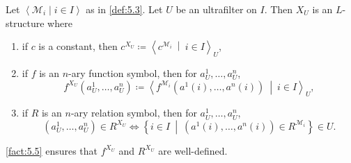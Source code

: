 \documentclass{article}
\begin{document}
\begin{ndef} \label{def:5.6}
Let $\left< \mathcal{M}_i \mid i \in I \right>$ as in \cref{def:5.3}. Let $U$ be an ultrafilter on $I$. Then $X_U$ is an $L$-structure where
\begin{enumerate}[label=(\roman*)]
\item if $c$ is a constant, then $c^{X_U} \coloneqq \left< c^{\mathcal{M}_i} \ \middle|\ i \in I \right>_U$,
\item if $f$ is an $n$-ary function symbol, then for $a_U^1, \dots, a_U^n$,
\[
f^{X_U}(a_U^1, \dots, a_U^n) \coloneqq \left< f^{\mathcal{M}_i}(a^1(i), \dots, a^n(i)) \ \middle|\ i \in I \right>_U,
\]
\item if $R$ is an $n$-ary relation symbol, then for $a_U^1, \dots, a_U^n$,
\[
(a_U^1, \dots, a_U^n) \in R^{X_U} \iff \left\{ i \in I \ \middle|\ (a^1(i), \dots, a^n(i)) \in R^{\mathcal{M}_i} \right\} \in U.
\]
\end{enumerate}
\end{ndef}
\begin{remark}
\cref{fact:5.5} ensures that $f^{X_U}$ and $R^{X_U}$ are well-defined.
\end{remark}
\end{document}
